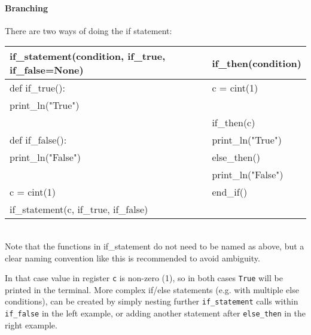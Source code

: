 \begin{mylisting}
\paragraph{Branching}
There are two ways of doing the if statement: 
\begin{center}
\begin{tabular}{|l|l|} \hline
\textbf{if_statement(condition, if_true, if_false=None)} & \textbf{if_then(condition)} \\ \hline
def if_true():                                           & c = cint(1)                 \\
\hspace{5 mm}print_ln("True")                            &                             \\
                                                         & if_then(c)                  \\
def if_false():                                          & print_ln("True")            \\
\hspace{5 mm}print_ln("False")                           & else_then()                 \\
                                                         & print_ln("False")           \\
c = cint(1)                                              & end_if()                    \\
if_statement(c, if_true, if_false)                       &                             \\ \hline
\end{tabular}
\begin{footnotesize}
\\ Note that the functions in if_statement do not need to be named as above, but a clear naming convention like this is recommended to avoid ambiguity.
\end{footnotesize}
\end{center}
In that case value in register \verb|c| is non-zero (1), so in both cases \verb|True| will be printed in the terminal. More complex if/else statements (e.g. with multiple else conditions), can be created by simply nesting further \verb|if_statement| calls within \verb|if_false| in the left example, or adding another statement after \verb|else_then| in the right example. \\


\end{mylisting}
